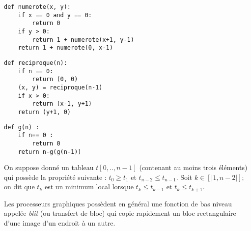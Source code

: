 \ifprof
\begin{corrige}
\begin{lstlisting}
def numerote(x, y):
    if x == 0 and y == 0:
        return 0
    if y > 0:
        return 1 + numerote(x+1, y-1)
    return 1 + numerote(0, x-1)
\end{lstlisting}
\end{corrige}
\else
\fi

\ifprof
\begin{corrige}
\begin{lstlisting}
def reciproque(n):
    if n == 0:
        return (0, 0)
    (x, y) = reciproque(n-1)
    if x > 0:
        return (x-1, y+1)
    return (y+1, 0)
\end{lstlisting}
\end{corrige}
\else
\fi




\setcounter{question}{0}

\begin{lstlisting}
def g(n) :
    if n== 0 : 
        return 0
    return n-g(g(n-1))
\end{lstlisting}


\exer{}
\setcounter{question}{0}

On suppose donné un tableau $t[0,.., n-1]$ (contenant au moins trois éléments) qui possède la propriété suivante : $t_0\geq t_1$ et $t_{n-2}\leq t_{n-1}$. Soit $k\in[|1,n-2|]$; on dit que $t_k$ est un minimum local lorsque $t_k\leq t_{k-1}$ et $t_k\leq t_{k+1}$.



\exer{}
\setcounter{question}{0}

Les processeurs graphiques possèdent en général une fonction de bas niveau appelée \textit{blit} (ou transfert de bloc) qui copie rapidement un bloc rectangulaire d’une image d’un endroit à un autre.

